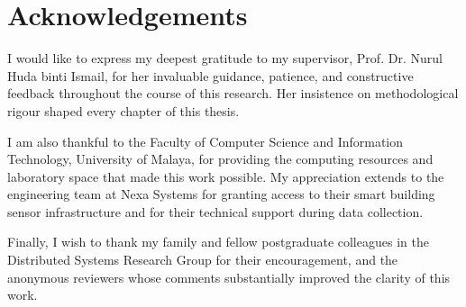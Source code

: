 \chapter*{Acknowledgements}

I would like to express my deepest gratitude to my supervisor, Prof. Dr. Nurul Huda binti Ismail,
for her invaluable guidance, patience, and constructive feedback throughout the course of this
research. Her insistence on methodological rigour shaped every chapter of this thesis.

I am also thankful to the Faculty of Computer Science and Information Technology, University of
Malaya, for providing the computing resources and laboratory space that made this work possible.
My appreciation extends to the engineering team at Nexa Systems for granting access to their smart
building sensor infrastructure and for their technical support during data collection.

Finally, I wish to thank my family and fellow postgraduate colleagues in the Distributed Systems
Research Group for their encouragement, and the anonymous reviewers whose comments substantially
improved the clarity of this work.

\tableofcontents
\clearpage
\listoffigures
{}
\clearpage
\listoftables
{}
